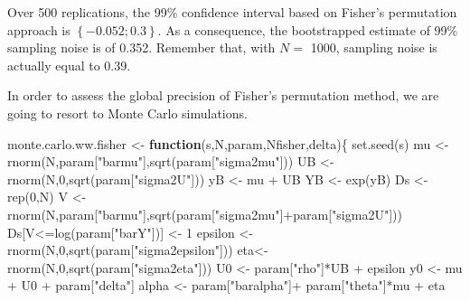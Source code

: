 \documentclass[
]{book}
\newenvironment{Shaded}{\begin{snugshade}}{\end{snugshade}}
\newcommand{\ControlFlowTok}[1]{\textcolor[rgb]{0.13,0.29,0.53}{\textbf{#1}}}
\newcommand{\DecValTok}[1]{\textcolor[rgb]{0.00,0.00,0.81}{#1}}
\newcommand{\FunctionTok}[1]{\textcolor[rgb]{0.00,0.00,0.00}{#1}}
\newcommand{\NormalTok}[1]{#1}
\newcommand{\OtherTok}[1]{\textcolor[rgb]{0.56,0.35,0.01}{#1}}
\newcommand{\SpecialCharTok}[1]{\textcolor[rgb]{0.00,0.00,0.00}{#1}}
\newcommand{\StringTok}[1]{\textcolor[rgb]{0.31,0.60,0.02}{#1}}
\theoremstyle{definition}
\theoremstyle{definition}
\theoremstyle{definition}
\theoremstyle{definition}
\theoremstyle{remark}
\begin{document}
Over 500 replications, the 99\% confidence interval based on Fisher's permutation approach is \(\left\{-0.052;0.3\right\}\).
As a consequence, the bootstrapped estimate of 99\% sampling noise is of 0.352.
Remember that, with \(N=\) 1000, sampling noise is actually equal to 0.39.

In order to assess the global precision of Fisher's permutation method, we are going to resort to Monte Carlo simulations.

\begin{Shaded}
\begin{Highlighting}[]
\NormalTok{monte.carlo.ww.fisher }\OtherTok{\textless{}{-}} \ControlFlowTok{function}\NormalTok{(s,N,param,Nfisher,delta)\{}
  \FunctionTok{set.seed}\NormalTok{(s)}
\NormalTok{  mu }\OtherTok{\textless{}{-}} \FunctionTok{rnorm}\NormalTok{(N,param[}\StringTok{"barmu"}\NormalTok{],}\FunctionTok{sqrt}\NormalTok{(param[}\StringTok{"sigma2mu"}\NormalTok{]))}
\NormalTok{  UB }\OtherTok{\textless{}{-}} \FunctionTok{rnorm}\NormalTok{(N,}\DecValTok{0}\NormalTok{,}\FunctionTok{sqrt}\NormalTok{(param[}\StringTok{"sigma2U"}\NormalTok{]))}
\NormalTok{  yB }\OtherTok{\textless{}{-}}\NormalTok{ mu }\SpecialCharTok{+}\NormalTok{ UB }
\NormalTok{  YB }\OtherTok{\textless{}{-}} \FunctionTok{exp}\NormalTok{(yB)}
\NormalTok{  Ds }\OtherTok{\textless{}{-}} \FunctionTok{rep}\NormalTok{(}\DecValTok{0}\NormalTok{,N)}
\NormalTok{  V }\OtherTok{\textless{}{-}} \FunctionTok{rnorm}\NormalTok{(N,param[}\StringTok{"barmu"}\NormalTok{],}\FunctionTok{sqrt}\NormalTok{(param[}\StringTok{"sigma2mu"}\NormalTok{]}\SpecialCharTok{+}\NormalTok{param[}\StringTok{"sigma2U"}\NormalTok{]))}
\NormalTok{  Ds[V}\SpecialCharTok{\textless{}=}\FunctionTok{log}\NormalTok{(param[}\StringTok{"barY"}\NormalTok{])] }\OtherTok{\textless{}{-}} \DecValTok{1} 
\NormalTok{  epsilon }\OtherTok{\textless{}{-}} \FunctionTok{rnorm}\NormalTok{(N,}\DecValTok{0}\NormalTok{,}\FunctionTok{sqrt}\NormalTok{(param[}\StringTok{"sigma2epsilon"}\NormalTok{]))}
\NormalTok{  eta}\OtherTok{\textless{}{-}} \FunctionTok{rnorm}\NormalTok{(N,}\DecValTok{0}\NormalTok{,}\FunctionTok{sqrt}\NormalTok{(param[}\StringTok{"sigma2eta"}\NormalTok{]))}
\NormalTok{  U0 }\OtherTok{\textless{}{-}}\NormalTok{ param[}\StringTok{"rho"}\NormalTok{]}\SpecialCharTok{*}\NormalTok{UB }\SpecialCharTok{+}\NormalTok{ epsilon}
\NormalTok{  y0 }\OtherTok{\textless{}{-}}\NormalTok{ mu }\SpecialCharTok{+}\NormalTok{  U0 }\SpecialCharTok{+}\NormalTok{ param[}\StringTok{"delta"}\NormalTok{]}
\NormalTok{  alpha }\OtherTok{\textless{}{-}}\NormalTok{ param[}\StringTok{"baralpha"}\NormalTok{]}\SpecialCharTok{+}\NormalTok{  param[}\StringTok{"theta"}\NormalTok{]}\SpecialCharTok{*}\NormalTok{mu }\SpecialCharTok{+}\NormalTok{ eta}

\end{Highlighting}
\end{Shaded}
\end{document}
